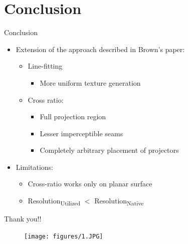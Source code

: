 \documentclass[40pt]{beamer}
\begin{document}
\section{Conclusion}
\begin{frame}{Conclusion}

\begin{itemize}
\item Extension of the approach described in Brown's paper:
\begin{itemize}
\item Line-fitting 
\begin{itemize}
\item More uniform texture generation
\end{itemize}
\item Cross ratio:
\begin{itemize}
\item Full projection region 
\item Lesser imperceptible seams
\item Completely arbitrary placement of projectors
\end{itemize}
\end{itemize}

\item Limitations:
\begin{itemize}
\item Cross-ratio works only on planar surface
\item \texorpdfstring{Resolution\textsubscript{Utilized}}{Resolution Utilized} $<$ \texorpdfstring{Resolution\textsubscript{Native}}{Resolution Native}
\end{itemize}
\end{itemize}

\end{frame}
\begin{frame}{Thank you!!}
\begin{figure}
\texttt{[image: figures/1.JPG]}
\end{figure}
\end{frame}

\end{document}
